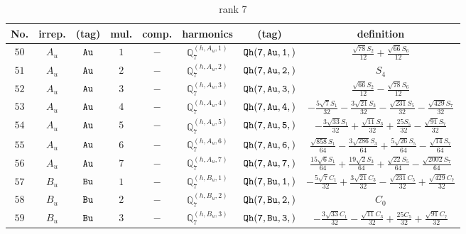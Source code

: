 \documentclass[fleqn,8pt]{jsarticle}
\begin{document}
\begin{table}[ht!]
\begin{center}
\caption{rank 7}
\renewcommand{\arraystretch}{1.3}
\begin{tabular}{cccccccc} \hline \hline
No. & irrep. & (tag) & mul. & comp. & harmonics & (tag) & definition \\ \hline
$ 50 $ & $ A_{u} $ & $ {\tt Au} $ & $ 1 $ & $ - $ & $ \mathbb{Q}_{7}^{(h,A_{u},1)} $ & $ {\tt Qh(7,Au,1,)} $ & $ \frac{\sqrt{78} S_{2}}{12} + \frac{\sqrt{66} S_{6}}{12} $ \\
$ 51 $ & $ A_{u} $ & $ {\tt Au} $ & $ 2 $ & $ - $ & $ \mathbb{Q}_{7}^{(h,A_{u},2)} $ & $ {\tt Qh(7,Au,2,)} $ & $ S_{4} $ \\
$ 52 $ & $ A_{u} $ & $ {\tt Au} $ & $ 3 $ & $ - $ & $ \mathbb{Q}_{7}^{(h,A_{u},3)} $ & $ {\tt Qh(7,Au,3,)} $ & $ \frac{\sqrt{66} S_{2}}{12} - \frac{\sqrt{78} S_{6}}{12} $ \\
$ 53 $ & $ A_{u} $ & $ {\tt Au} $ & $ 4 $ & $ - $ & $ \mathbb{Q}_{7}^{(h,A_{u},4)} $ & $ {\tt Qh(7,Au,4,)} $ & $ - \frac{5 \sqrt{7} S_{1}}{32} - \frac{3 \sqrt{21} S_{3}}{32} - \frac{\sqrt{231} S_{5}}{32} - \frac{\sqrt{429} S_{7}}{32} $ \\
$ 54 $ & $ A_{u} $ & $ {\tt Au} $ & $ 5 $ & $ - $ & $ \mathbb{Q}_{7}^{(h,A_{u},5)} $ & $ {\tt Qh(7,Au,5,)} $ & $ - \frac{3 \sqrt{33} S_{1}}{32} + \frac{\sqrt{11} S_{3}}{32} + \frac{25 S_{5}}{32} - \frac{\sqrt{91} S_{7}}{32} $ \\
$ 55 $ & $ A_{u} $ & $ {\tt Au} $ & $ 6 $ & $ - $ & $ \mathbb{Q}_{7}^{(h,A_{u},6)} $ & $ {\tt Qh(7,Au,6,)} $ & $ \frac{\sqrt{858} S_{1}}{64} - \frac{3 \sqrt{286} S_{3}}{64} + \frac{5 \sqrt{26} S_{5}}{64} - \frac{\sqrt{14} S_{7}}{64} $ \\
$ 56 $ & $ A_{u} $ & $ {\tt Au} $ & $ 7 $ & $ - $ & $ \mathbb{Q}_{7}^{(h,A_{u},7)} $ & $ {\tt Qh(7,Au,7,)} $ & $ \frac{15 \sqrt{6} S_{1}}{64} + \frac{19 \sqrt{2} S_{3}}{64} + \frac{\sqrt{22} S_{5}}{64} - \frac{\sqrt{2002} S_{7}}{64} $ \\
$ 57 $ & $ B_{u} $ & $ {\tt Bu} $ & $ 1 $ & $ - $ & $ \mathbb{Q}_{7}^{(h,B_{u},1)} $ & $ {\tt Qh(7,Bu,1,)} $ & $ - \frac{5 \sqrt{7} C_{1}}{32} + \frac{3 \sqrt{21} C_{3}}{32} - \frac{\sqrt{231} C_{5}}{32} + \frac{\sqrt{429} C_{7}}{32} $ \\
$ 58 $ & $ B_{u} $ & $ {\tt Bu} $ & $ 2 $ & $ - $ & $ \mathbb{Q}_{7}^{(h,B_{u},2)} $ & $ {\tt Qh(7,Bu,2,)} $ & $ C_{0} $ \\
$ 59 $ & $ B_{u} $ & $ {\tt Bu} $ & $ 3 $ & $ - $ & $ \mathbb{Q}_{7}^{(h,B_{u},3)} $ & $ {\tt Qh(7,Bu,3,)} $ & $ - \frac{3 \sqrt{33} C_{1}}{32} - \frac{\sqrt{11} C_{3}}{32} + \frac{25 C_{5}}{32} + \frac{\sqrt{91} C_{7}}{32} $ \\

\end{tabular}
\end{center}
\end{table}
\end{document}
